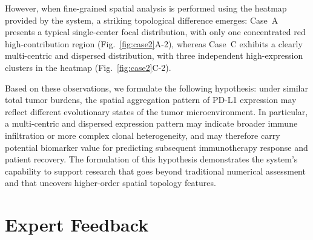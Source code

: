 \documentclass[journal]{vgtc}                     %
\begin{document}
However, when fine-grained spatial analysis is performed using the heatmap provided by the system, a striking topological difference emerges: Case~A presents a typical single-center focal distribution, with only one concentrated red high-contribution region (Fig.~\ref{fig:case2}A-2), whereas Case~C exhibits a clearly multi-centric and dispersed distribution, with three independent high-expression clusters in the heatmap (Fig.~\ref{fig:case2}C-2).

Based on these observations, we formulate the following hypothesis: under similar total tumor burdens, the spatial aggregation pattern of PD-L1 expression may reflect different evolutionary states of the tumor microenvironment. In particular, a multi-centric and dispersed expression pattern may indicate broader immune infiltration or more complex clonal heterogeneity, and may therefore carry potential biomarker value for predicting subsequent immunotherapy response and patient recovery. The formulation of this hypothesis demonstrates the system's capability to support research that goes beyond traditional numerical assessment and that uncovers higher-order spatial topology features.


\section{Expert Feedback}
\end{document}
